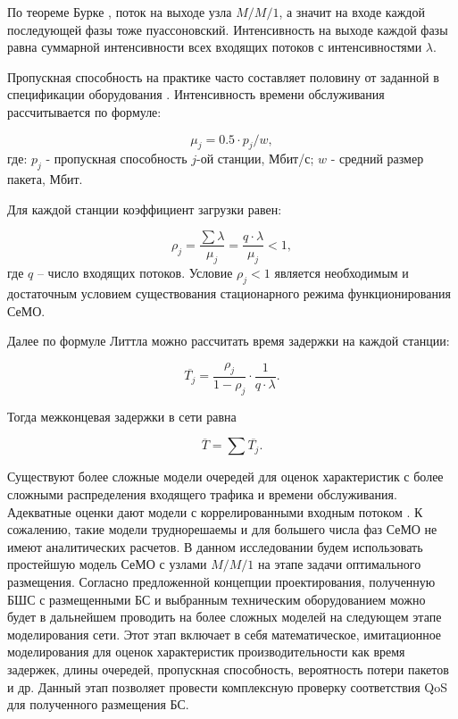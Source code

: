 По теореме Бурке \cite{Burke1956}, поток на выходе узла $M/M/1$, а значит на входе каждой последующей фазы тоже пуассоновский. Интенсивность на выходе каждой фазы равна суммарной интенсивности всех входящих потоков с интенсивностями $\lambda$.

Пропускная способность на практике часто составляет половину от заданной в спецификации оборудования \cite{Proletarsky, Vladimirov2019}. Интенсивность времени обслуживания рассчитывается по формуле: 

\begin{displaymath}
    \mu_j = 0.5 \cdot p_j / w,
\end{displaymath}
где: $p_j$ - пропускная способность $j$-ой станции, Мбит/с; $w$ - средний размер пакета, Мбит.

Для каждой станции коэффициент загрузки равен:


\begin{displaymath}
\rho_j= \frac{\sum{\lambda}}{\mu_j} = \frac{q \cdot \lambda}{\mu_j} <1,
\end{displaymath}
где $q$ -- число входящих потоков. Условие $\rho_j<1$ является необходимым и достаточным условием существования стационарного режима функционирования СеМО.

Далее по формуле Литтла \cite{Little1961} можно рассчитать время задержки на каждой станции:

\begin{displaymath}
    \overline{T_j} = \frac{\rho_j}{1 - \rho_j} \cdot \frac{1}{q \cdot \lambda}.
\end{displaymath}

Тогда межконцевая задержки в сети равна

\begin{equation}
    \label{eq:end_to_end_delay}
    \overline{T}= \sum{\overline{T_j}}.
\end{equation}


Существуют более сложные модели очередей для оценок характеристик с более сложными распределения входящего трафика и времени обслуживания. Адекватные оценки дают модели с коррелированными входным потоком \cite{Vishnevsky2016_Methods_of_performance, Larionov2019}. К сожалению, такие модели труднорешаемы и для большего числа фаз СеМО не имеют аналитических расчетов. В данном исследовании будем использовать простейшую модель СеМО с узлами $M/M/1$ на этапе задачи оптимального размещения. Согласно предложенной концепции проектирования, полученную БШС с размещенными БС и выбранным техническим оборудованием можно будет в дальнейшем проводить на более сложных моделей на следующем этапе моделирования сети. Этот этап включает в себя математическое, имитационное моделирования для оценок характеристик производительности как время задержек, длины очередей, пропускная способность, вероятность потери пакетов и др. Данный этап позволяет провести комплексную проверку соответствия QoS для полученного размещения БС.

